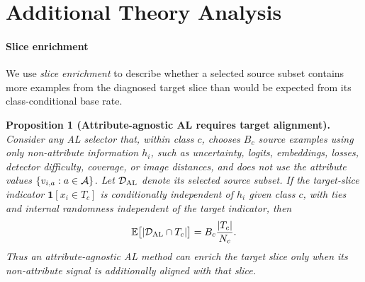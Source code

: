 \section{Additional Theory Analysis}
\label{app:theory-analysis}

\paragraph{Slice enrichment}
We use \emph{slice enrichment} to describe whether a selected source subset contains more examples from the diagnosed target slice than would be expected from its class-conditional base rate.

\begin{tcolorbox}[
    colback=blue!2!white,
    colframe=blue!20!white,
    arc=3pt,
    boxrule=1pt,
    drop shadow,
    breakable
]
\textbf{Proposition 1 (Attribute-agnostic AL requires target alignment).} \textit{Consider any AL selector that, within class $c$, chooses $B_c$ source examples using only non-attribute information $h_i$, such as uncertainty, logits, embeddings, losses, detector difficulty, coverage, or image distances, and does not use the attribute values $\{v_{i,a}:a\in\mathcal{A}\}$. Let $\mathcal{D}_{\mathrm{AL}}$ denote its selected source subset. If the target-slice indicator $\mathbf{1}[x_i\in T_c]$ is conditionally independent of $h_i$ given class $c$, with ties and internal randomness independent of the target indicator, then
\begin{equation*}
\mathbb{E}\big[|\mathcal{D}_{\mathrm{AL}}\cap T_c|\big]
=
B_c\frac{|T_c|}{N_c}.
\end{equation*}
Thus an attribute-agnostic AL method can enrich the target slice only when its non-attribute signal is additionally aligned with that slice.}
\end{tcolorbox}

